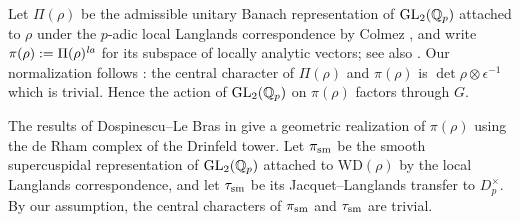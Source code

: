 \documentclass[a4paper,10pt]{amsart}
\theoremstyle{remark}
\theoremstyle{definition}
\theoremstyle{plain}
\numberwithin{equation}{section}
\newcommand{\bbQ}{{\mathbb Q}}
\newcommand{\GL}{{\rm GL}}
\newcommand{\la}{{\it la}}
\newcommand{\sm}{{\rm sm}}
\newcommand{\WD}{\mathrm{WD}}
\begin{document}
Let $\Pi(\rho)$ be the admissible unitary Banach representation of $\GL_2(\bbQ_p)$ attached to $\rho$ under the $p$-adic local Langlands correspondence by Colmez \cite{colmez2010representations}, and write $\pi(\rho):=\Pi(\rho)^{\la}$ for its subspace of locally analytic vectors; see also \cite[\S0.2]{colmezDospinescuNiziol2020}. Our normalization follows \cite{colmez2010representations,colmezDospinescuNiziol2020}: the central character of $\Pi(\rho)$ and $\pi(\rho)$ is $\det\rho\otimes\epsilon^{-1}$ which is trivial. Hence the action of $\GL_2(\bbQ_p)$ on $\pi(\rho)$ factors through $G$. 

The results of Dospinescu--Le Bras in \cite[Thm.~1.2 \& Thm.~1.4]{dospinescuLeBras2017revetements} give a geometric realization of
$\pi(\rho)$ using the de Rham complex of the Drinfeld tower.  Let $\pi_{\sm}$ be the smooth supercuspidal representation of $\GL_2(\bbQ_p)$ attached to $\WD(\rho)$ by the local Langlands correspondence, and let $\tau_{\sm}$ be its Jacquet--Langlands transfer to $D_p^\times$. By our assumption, the central characters of $\pi_{\sm}$ and $\tau_{\sm}$ are trivial. 
\end{document}
